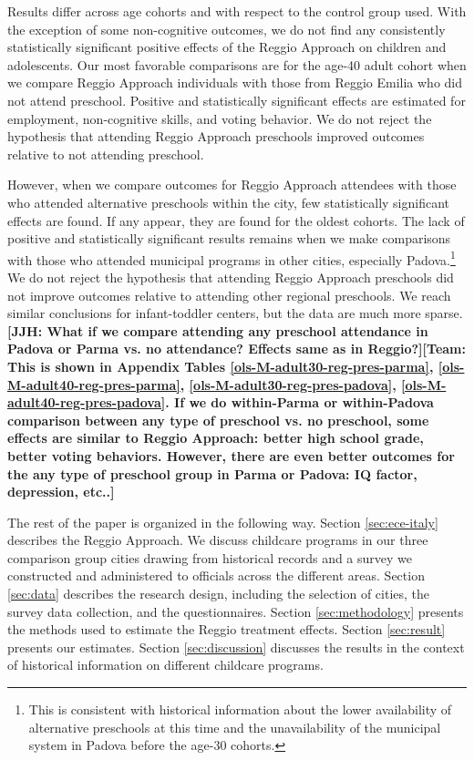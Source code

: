 Results differ across age cohorts and with respect to the control group used. With the exception of some non-cognitive outcomes, we do not find any consistently statistically significant positive effects of the Reggio Approach on children and adolescents. Our most favorable comparisons are for the age-40 adult cohort when we compare Reggio Approach individuals with those from Reggio Emilia who did not attend preschool. Positive and statistically significant effects are estimated for employment, non-cognitive skills, and voting behavior. We do not reject the hypothesis that attending Reggio Approach preschools improved outcomes relative to not attending preschool.

However, when we compare outcomes for Reggio Approach attendees with those who attended alternative preschools within the city, few statistically significant effects are found. If any appear, they are found for the oldest cohorts. The lack of positive and statistically significant results remains when we make comparisons with those who attended municipal programs in other cities, especially Padova.\footnote{This is consistent with historical information about the lower availability of alternative preschools at this time and the unavailability of the municipal system in Padova before the age-30 cohorts.} We do not reject the hypothesis that attending Reggio Approach preschools did not improve outcomes relative to attending other regional preschools. We reach similar conclusions for infant-toddler centers, but the data are much more sparse. \textbf{[JJH: What if we compare attending any preschool attendance in Padova or Parma vs. no attendance? Effects same as in Reggio?][Team: This is shown in Appendix Tables \ref{ols-M-adult30-reg-pres-parma}, \ref{ols-M-adult40-reg-pres-parma}, \ref{ols-M-adult30-reg-pres-padova}, \ref{ols-M-adult40-reg-pres-padova}. If we do within-Parma or within-Padova comparison between any type of preschool vs. no preschool, some effects are similar to Reggio Approach: better high school grade, better voting behaviors. However, there are even better outcomes for the any type of preschool group in Parma or Padova: IQ factor, depression, etc..]}

The rest of the paper is organized in the following way. Section \ref{sec:ece-italy} describes the Reggio Approach. We discuss childcare programs in our three comparison group cities drawing from historical records and a survey we constructed and administered to officials across the different areas. Section \ref{sec:data} describes the research design, including the selection of cities, the survey data collection, and the questionnaires. Section \ref{sec:methodology} presents the methods used to estimate the Reggio treatment effects. Section \ref{sec:result} presents our estimates. Section \ref{sec:discussion} discusses the results in the context of historical information on different childcare programs.

